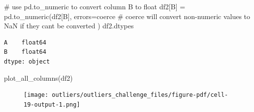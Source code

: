 \documentclass[
  letterpaper,
  DIV=11,
  numbers=noendperiod,
  oneside]{scrreprt}
\newenvironment{Shaded}{\begin{snugshade}}{\end{snugshade}}
\newcommand{\CommentTok}[1]{\textcolor[rgb]{0.37,0.37,0.37}{#1}}
\newcommand{\NormalTok}[1]{\textcolor[rgb]{0.00,0.23,0.31}{#1}}
\newcommand{\OperatorTok}[1]{\textcolor[rgb]{0.37,0.37,0.37}{#1}}
\newcommand{\StringTok}[1]{\textcolor[rgb]{0.13,0.47,0.30}{#1}}
\begin{document}
\begin{Shaded}
\begin{Highlighting}[]
\CommentTok{\# use pd.to\_numeric to convert column \textquotesingle{}B\textquotesingle{} to float}
\NormalTok{df2[}\StringTok{\textquotesingle{}B\textquotesingle{}}\NormalTok{] }\OperatorTok{=}\NormalTok{ pd.to\_numeric(df2[}\StringTok{\textquotesingle{}B\textquotesingle{}}\NormalTok{],}
\NormalTok{                          errors}\OperatorTok{=}\StringTok{\textquotesingle{}coerce\textquotesingle{}}  \CommentTok{\# \textquotesingle{}coerce\textquotesingle{} will convert non{-}numeric values to NaN if they can\textquotesingle{}t be converted}
\NormalTok{                          )}
\NormalTok{df2.dtypes}
\end{Highlighting}
\end{Shaded}

\begin{verbatim}
A    float64
B    float64
dtype: object
\end{verbatim}

\begin{Shaded}
\begin{Highlighting}[]
\NormalTok{plot\_all\_columns(df2)}
\end{Highlighting}
\end{Shaded}

\begin{figure}[H]

{\centering \texttt{[image: outliers/outliers\_challenge\_files/figure-pdf/cell-19-output-1.png]}

}

\end{figure}
\end{document}
